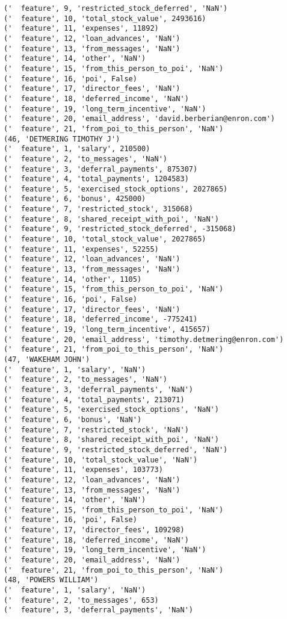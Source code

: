 \begin{verbatim}
('  feature', 9, 'restricted_stock_deferred', 'NaN')
('  feature', 10, 'total_stock_value', 2493616)
('  feature', 11, 'expenses', 11892)
('  feature', 12, 'loan_advances', 'NaN')
('  feature', 13, 'from_messages', 'NaN')
('  feature', 14, 'other', 'NaN')
('  feature', 15, 'from_this_person_to_poi', 'NaN')
('  feature', 16, 'poi', False)
('  feature', 17, 'director_fees', 'NaN')
('  feature', 18, 'deferred_income', 'NaN')
('  feature', 19, 'long_term_incentive', 'NaN')
('  feature', 20, 'email_address', 'david.berberian@enron.com')
('  feature', 21, 'from_poi_to_this_person', 'NaN')
(46, 'DETMERING TIMOTHY J')
('  feature', 1, 'salary', 210500)
('  feature', 2, 'to_messages', 'NaN')
('  feature', 3, 'deferral_payments', 875307)
('  feature', 4, 'total_payments', 1204583)
('  feature', 5, 'exercised_stock_options', 2027865)
('  feature', 6, 'bonus', 425000)
('  feature', 7, 'restricted_stock', 315068)
('  feature', 8, 'shared_receipt_with_poi', 'NaN')
('  feature', 9, 'restricted_stock_deferred', -315068)
('  feature', 10, 'total_stock_value', 2027865)
('  feature', 11, 'expenses', 52255)
('  feature', 12, 'loan_advances', 'NaN')
('  feature', 13, 'from_messages', 'NaN')
('  feature', 14, 'other', 1105)
('  feature', 15, 'from_this_person_to_poi', 'NaN')
('  feature', 16, 'poi', False)
('  feature', 17, 'director_fees', 'NaN')
('  feature', 18, 'deferred_income', -775241)
('  feature', 19, 'long_term_incentive', 415657)
('  feature', 20, 'email_address', 'timothy.detmering@enron.com')
('  feature', 21, 'from_poi_to_this_person', 'NaN')
(47, 'WAKEHAM JOHN')
('  feature', 1, 'salary', 'NaN')
('  feature', 2, 'to_messages', 'NaN')
('  feature', 3, 'deferral_payments', 'NaN')
('  feature', 4, 'total_payments', 213071)
('  feature', 5, 'exercised_stock_options', 'NaN')
('  feature', 6, 'bonus', 'NaN')
('  feature', 7, 'restricted_stock', 'NaN')
('  feature', 8, 'shared_receipt_with_poi', 'NaN')
('  feature', 9, 'restricted_stock_deferred', 'NaN')
('  feature', 10, 'total_stock_value', 'NaN')
('  feature', 11, 'expenses', 103773)
('  feature', 12, 'loan_advances', 'NaN')
('  feature', 13, 'from_messages', 'NaN')
('  feature', 14, 'other', 'NaN')
('  feature', 15, 'from_this_person_to_poi', 'NaN')
('  feature', 16, 'poi', False)
('  feature', 17, 'director_fees', 109298)
('  feature', 18, 'deferred_income', 'NaN')
('  feature', 19, 'long_term_incentive', 'NaN')
('  feature', 20, 'email_address', 'NaN')
('  feature', 21, 'from_poi_to_this_person', 'NaN')
(48, 'POWERS WILLIAM')
('  feature', 1, 'salary', 'NaN')
('  feature', 2, 'to_messages', 653)
('  feature', 3, 'deferral_payments', 'NaN')

\end{verbatim}
